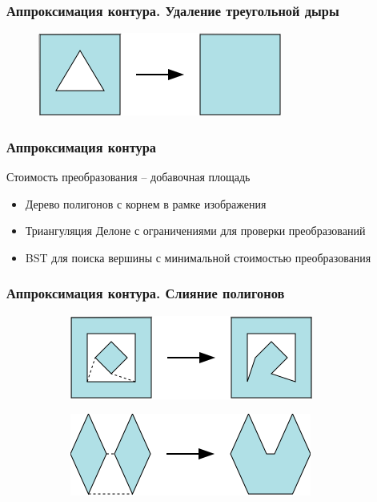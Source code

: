 \documentclass[10pt, unicode]{beamer}
\begin{document}
    \begin{frame}
        \frametitle{Аппроксимация контура. Удаление треугольной дыры}
        \begin{figure}[H]
            \centering
            \includegraphics[scale=0.8]{images/remove_triangular_hole.png}
        \end{figure}
    \end{frame}
    \begin{frame}
        \frametitle{Аппроксимация контура}
        Стоимость преобразования -- добавочная площадь
        \begin{itemize}
            \item Дерево полигонов с корнем в рамке изображения
            \item Триангуляция Делоне с ограничениями для проверки преобразований
            \item BST для поиска вершины с минимальной стоимостью преобразования
        \end{itemize}
    \end{frame}
    \begin{frame}
        \frametitle{Аппроксимация контура. Слияние полигонов}
        \begin{figure}[H]
            \centering
            \begin{subfigure}[t]{\linewidth}
                \centering
                \includegraphics[scale=0.8]{images/polygonmerge.png}
            \end{subfigure}
            \begin{subfigure}[t]{\linewidth}
                \centering
                \includegraphics[scale=0.8]{images/polygonmerge2.png}
            \end{subfigure}
        \end{figure}
    \end{frame}
\end{document}
